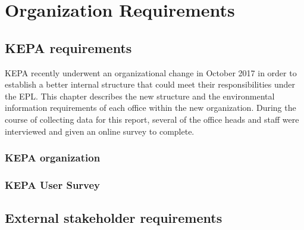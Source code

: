 \chapter{Organization Requirements}

\section{KEPA requirements}

KEPA recently underwent an organizational change in October 2017 in order to establish a better internal structure that could meet their responsibilities under the EPL. This chapter describes the new structure and the environmental information requirements of each office within the new organization.  During the course of collecting data for this report, several of the office heads and staff were interviewed and given an online survey to complete. 

\subsection{KEPA organization}

\subsection{KEPA User Survey}

\section{External stakeholder requirements}
